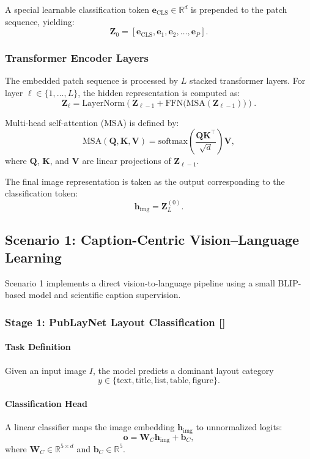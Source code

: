 \documentclass[12pt, titlepage]{article}
\begin{document}
A special learnable classification token
$\mathbf{e}_{\text{CLS}} \in \mathbb{R}^d$ is prepended to the patch sequence,
yielding:
\[
\mathbf{Z}_0 =
[\mathbf{e}_{\text{CLS}}, \mathbf{e}_1, \mathbf{e}_2, \dots, \mathbf{e}_P].
\]

\subsubsection{Transformer Encoder Layers}

The embedded patch sequence is processed by $L$ stacked transformer layers. For
layer $\ell \in \{1,\dots,L\}$, the hidden representation is computed as:
\[
\mathbf{Z}_\ell =
\text{LayerNorm}\left(
\mathbf{Z}_{\ell-1} +
\text{FFN}\big(\text{MSA}(\mathbf{Z}_{\ell-1})\big)
\right).
\]

Multi-head self-attention (MSA) is defined by:
\[
\text{MSA}(\mathbf{Q}, \mathbf{K}, \mathbf{V}) =
\text{softmax}\left(
\frac{\mathbf{Q}\mathbf{K}^\top}{\sqrt{d}}
\right)\mathbf{V},
\]
where $\mathbf{Q}$, $\mathbf{K}$, and $\mathbf{V}$ are linear projections of
$\mathbf{Z}_{\ell-1}$.

The final image representation is taken as the output corresponding to the
classification token:
\[
\mathbf{h}_{\text{img}} = \mathbf{Z}_L^{(0)}.
\]

\subsection{Scenario 1: Caption-Centric Vision--Language Learning}

Scenario 1 implements a direct vision-to-language pipeline using a small BLIP-based
model and scientific caption supervision.

\subsubsection{Stage 1: PubLayNet Layout Classification [\cite{zhong2019publaynet}]}

\paragraph{Task Definition}
Given an input image $I$, the model predicts a dominant layout category
\[
y \in \{\text{text}, \text{title}, \text{list}, \text{table}, \text{figure}\}.
\]

\paragraph{Classification Head}
A linear classifier maps the image embedding $\mathbf{h}_{\text{img}}$ to
unnormalized logits:
\[
\mathbf{o} = \mathbf{W}_C \mathbf{h}_{\text{img}} + \mathbf{b}_C,
\]
where $\mathbf{W}_C \in \mathbb{R}^{5 \times d}$ and
$\mathbf{b}_C \in \mathbb{R}^5$.
\end{document}
